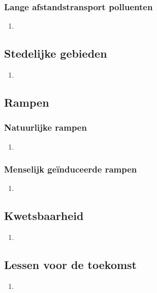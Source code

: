 \documentclass[12pt]{article}
\begin{document}
    \subsubsection{Lange afstandstransport polluenten}
    \begin{enumerate}
        \item 
    \end{enumerate}

    
    \subsection{Stedelijke gebieden}
    \begin{enumerate}
        \item 
    \end{enumerate}


    \subsection{Rampen}
    \subsubsection{Natuurlijke rampen}
    \begin{enumerate}
        \item 
    \end{enumerate}

    \subsubsection{Menselijk geïnduceerde rampen}
    \begin{enumerate}
        \item 
    \end{enumerate}


    \subsection{Kwetsbaarheid}
    \begin{enumerate}
        \item 
    \end{enumerate}


    \subsection{Lessen voor de toekomst}
    \begin{enumerate}
        \item 
    \end{enumerate}
\end{document}
